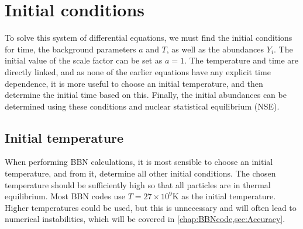 
\section{Initial conditions}
To solve this system of differential equations, we must find the initial conditions for time, the background parameters $a$ and $T$, as well as the abundances $Y_i$.
The initial value of the scale factor can be set as $a=1$. The temperature and time are directly linked, and as none of the earlier equations have any explicit time dependence, it is more useful to choose an initial temperature, and then determine the initial time based on this. Finally, the initial abundances can be determined using these conditions and nuclear statistical equilibrium (NSE).

\subsection{Initial temperature}
When performing BBN calculations, it is most sensible to choose an initial temperature, and from it, determine all other initial conditions. The chosen temperature should be sufficiently high so that all particles are in thermal equilibrium. Most BBN codes use $T=27\times10^9$K as the initial temperature. Higher temperatures could be used, but this is unnecessary and will often lead to numerical instabilities, which will be covered in \cref{chap:BBNcode,sec:Accuracy}.

